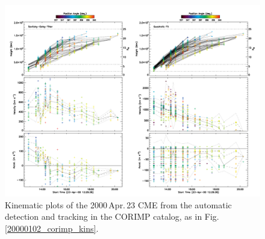 \documentclass[referee,a4paper,12pt,traditabstract]{swsc}
\begin{document}
\begin{linenumbers}
\begin{figure}[t]
\centerline{\includegraphics[width=\linewidth]{images/20000423_corimp_kins.pdf}}
\caption{Kinematic plots of the 2000\,Apr.\,23 CME from the automatic detection and tracking in the CORIMP catalog, as in Fig.\,\ref{20000102_corimp_kins}.}
\label{20000423_corimp_kins}
\end{figure}



\end{linenumbers}
\end{document}

